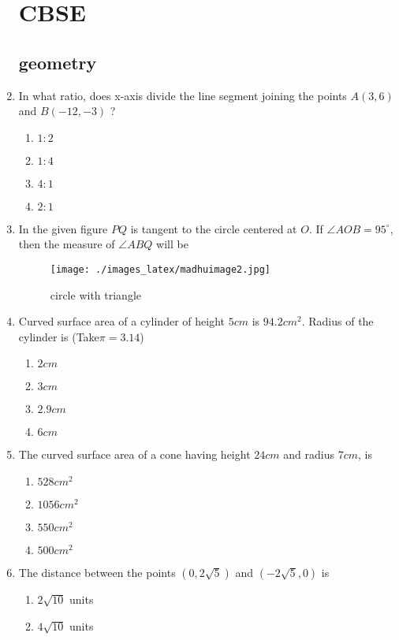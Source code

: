 \documentclass{article}
\begin{document}
\begin{enumerate}
\section{CBSE}
\subsection{geometry}
\item  In what ratio, does x-axis divide the line segment joining the points $A (3,6)$ and $B (-12,-3)$ ?  
\begin{enumerate} 
\item $1 : 2$
\item $1 : 4$
\item $4 : 1$ 
\item $2 : 1$
\end{enumerate}
\item In the given figure $PQ$ is tangent to the circle centered at $O$. If $\angle AOB = 95^\circ$, then the measure of $\angle ABQ$ will be
\begin{figure}[H] 
\centering
\texttt{[image: ./images\_latex/madhuimage2.jpg]}  
\label{fig:fig2}
\caption{circle with triangle}
\end{figure}
\item  Curved surface area of a cylinder of height $5cm$ is $94.2cm^2$. Radius of the cylinder is (Take$\pi=3.14$) 
\begin{enumerate} 
\item $2 cm$
\item $3 cm$
\item $2.9 cm$ 
\item $6 cm$
\end{enumerate}
 \item The curved surface area of a cone having height $24 cm$ and radius $7 cm$, is
 \begin{enumerate}
 \item $528 cm^2$ 
 \item $1056 cm^2$
 \item $550 cm^2$ 
 \item $500 cm^2$ 
 \end{enumerate}
 \item  The distance between the points $(0,2\sqrt{5})$ and $(-2\sqrt{5},0)$ is 
 \begin{enumerate} 
 \item $2\sqrt{10}$ units 
 \item $4\sqrt{10}$ units 

\end{enumerate}
\end{enumerate}
\end{document}
